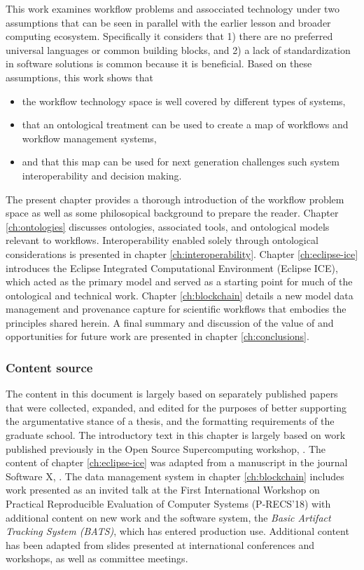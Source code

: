 This work examines workflow problems and assocciated technology under two
assumptions that can be seen in parallel with the earlier lesson and broader
computing ecosystem. Specifically it considers that 1) there are no preferred
universal languages or common building blocks, and 2) a lack of standardization
in software solutions is common because it is beneficial. Based
on these assumptions, this work shows that 
\begin{itemize}
  \item the workflow technology space is well covered by different types
  of systems,
  \item that an ontological treatment can be used to create a map of
  workflows and workflow management systems,
  \item and that this map can be used for next generation
  challenges such system interoperability and decision making.
\end{itemize}

The present chapter provides a thorough introduction of the workflow problem
space as well as some philosopical background to prepare the reader. Chapter
\ref{ch:ontologies} discusses ontologies, associated tools, and ontological
models relevant to workflows. Interoperability enabled solely through
ontological considerations is presented in chapter
\ref{ch:interoperability}. Chapter \ref{ch:eclipse-ice} introduces the
Eclipse Integrated Computational Environment (Eclipse ICE), which acted as the
primary model and served as a starting point for much of the
ontological and technical work. Chapter \ref{ch:blockchain} details a new model
data management and provenance capture for scientific workflows that embodies
the principles shared herein. A final summary and discussion of the
value of and opportunities for future work are presented in chapter
\ref{ch:conclusions}.

\subsubsection{Content source}

The content in this document is largely based on separately published papers
that were collected, expanded, and edited for the purposes of better supporting
the argumentative stance of a thesis, and the formatting requirements of
the graduate school. The introductory text in this chapter is largely based on
work published previously in the Open Source Supercomputing workshop,
\cite{billings_toward_2017}. The content of chapter \ref{ch:eclipse-ice} was
adapted from a manuscript in the journal Software X,
\cite{billings_eclipse_2017}. The data management system in chapter
\ref{ch:blockchain} includes work presented as an invited talk at the First
International Workshop on Practical Reproducible Evaluation of Computer Systems
(P-RECS'18) with additional content on new work and the software system, the
\textit{Basic Artifact Tracking System (BATS)}, which has entered production
use. Additional content has been adapted from slides presented at international
conferences and workshops, as well as committee meetings.

